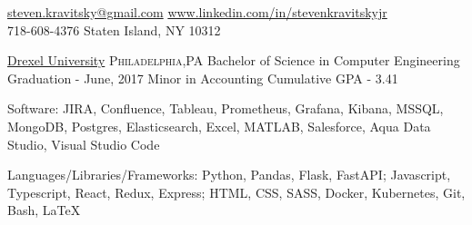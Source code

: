 \documentclass[10pt,letterpaper]{article}
\begin{document}
\sloppy  %

\nobreakvspace{0.3em}  %

\noindent\href{mailto:steven.kravitsky@gmail.com}{steven.kravitsky\mbox{}@\mbox{}gmail.com}\sbull
\href{http://www.linkedin.com/in/stevenkravitskyjr}{www.linkedin.com/in/stevenkravitskyjr}
\\
718-608-4376\sbull
Staten Island, NY 10312

\spacedhrule{0.9em}{-0.4em}  %


\headedsection
  {\href{http://www.drexel.edu/}{Drexel University}}
  {\textsc{Philadelphia,PA}} {%
  \headedsubsectiontwo
    {Bachelor of Science in Computer Engineering}
    {Graduation - June, 2017}
    {Minor in Accounting}
    {Cumulative GPA - 3.41}
}

\spacedhrule{0.9em}{-0.4em}


\inlineheadsection  %
  {Software:}
  {JIRA, Confluence, Tableau, Prometheus, Grafana, Kibana, MSSQL, MongoDB, Postgres, Elasticsearch, Excel, MATLAB, Salesforce, Aqua Data Studio, Visual Studio Code}

\vspace{0.1em}
\inlineheadsection
  {Languages/Libraries/Frameworks:}
  {Python, Pandas, Flask, FastAPI; Javascript, Typescript, React, Redux, Express; HTML, CSS, SASS, Docker, Kubernetes, Git, Bash, LaTeX}

\spacedhrule{1.8em}{-0.4em}

\end{document}
